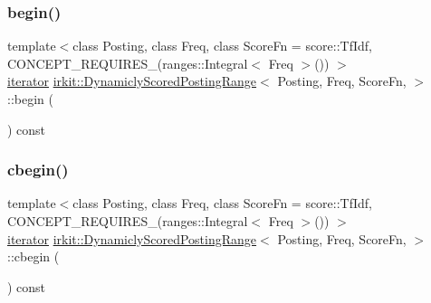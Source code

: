 \subsubsection{\texorpdfstring{begin()}{begin()}}
{\footnotesize\ttfamily template$<$class Posting, class Freq, class Score\+Fn = score\+::\+Tf\+Idf, C\+O\+N\+C\+E\+P\+T\+\_\+\+R\+E\+Q\+U\+I\+R\+E\+S\+\_\+(ranges\+::\+Integral$<$ Freq $>$()) $>$ \\
\hyperlink{classirkit_1_1DynamiclyScoredPostingRange_1_1iterator}{iterator} \hyperlink{classirkit_1_1DynamiclyScoredPostingRange}{irkit\+::\+Dynamicly\+Scored\+Posting\+Range}$<$ Posting, Freq, Score\+Fn, $>$\+::begin (\begin{DoxyParamCaption}{ }\end{DoxyParamCaption}) const\hspace{0.3cm}{\ttfamily [inline]}}

\mbox{\label{classirkit_1_1DynamiclyScoredPostingRange_a9fe9532cee4feaeefe305e8593f436b6}} 
\subsubsection{\texorpdfstring{cbegin()}{cbegin()}}
{\footnotesize\ttfamily template$<$class Posting, class Freq, class Score\+Fn = score\+::\+Tf\+Idf, C\+O\+N\+C\+E\+P\+T\+\_\+\+R\+E\+Q\+U\+I\+R\+E\+S\+\_\+(ranges\+::\+Integral$<$ Freq $>$()) $>$ \\
\hyperlink{classirkit_1_1DynamiclyScoredPostingRange_1_1iterator}{iterator} \hyperlink{classirkit_1_1DynamiclyScoredPostingRange}{irkit\+::\+Dynamicly\+Scored\+Posting\+Range}$<$ Posting, Freq, Score\+Fn, $>$\+::cbegin (\begin{DoxyParamCaption}{ }\end{DoxyParamCaption}) const\hspace{0.3cm}{\ttfamily [inline]}}

\mbox{\label{classirkit_1_1DynamiclyScoredPostingRange_a85219c57f0da94d00d1ed1c8f041d976}} 
